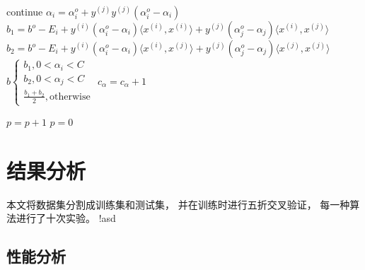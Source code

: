 \documentclass[cn,hazy,blue,14pt,normal]{elegantnote}
\begin{document}
\begin{algorithm}
    \begin{algorithmic}[1]
        \State continue
        \EndIf
        \State $\alpha_i=\alpha_i^o+
            y^{(j)}y^{(j)} (\alpha_i^o-\alpha_i)$
        \State $b_1=b^o-E_i+
            y^{(i)}(\alpha_i^o-\alpha_i)\langle x^{(i)},x^{(i)}\rangle
            +y^{(j)}(\alpha_j^o-\alpha_j)\langle x^{(i)},x^{(j)}\rangle$
        \State $b_2=b^o-E_i+
            y^{(i)}(\alpha_i^o-\alpha_i)\langle x^{(i)},x^{(j)}\rangle
            +y^{(j)}(\alpha_j^o-\alpha_j)\langle x^{(j)},x^{(j)}\rangle$
        \State $b
            \begin{cases}
                b_1, 0<\alpha_i<C \\
                b_2, 0<\alpha_j<C \\
                \frac {b_1+b_2}{2}, \text{otherwise}
            \end{cases}
        $
        \State $c_\alpha=c_\alpha+1$
        \EndIf
        \EndFor

        \State $p=p+1$
        \Else
        \State $p=0$
        \EndIf
        \EndWhile
        \EndFunction
    \end{algorithmic}
\end{algorithm}
\newpage

\section{结果分析}
本文将数据集分割成训练集和测试集，
并在训练时进行五折交叉验证，
每一种算法进行了十次实验。
{{!asd}}
\subsection{性能分析}
\end{document}
